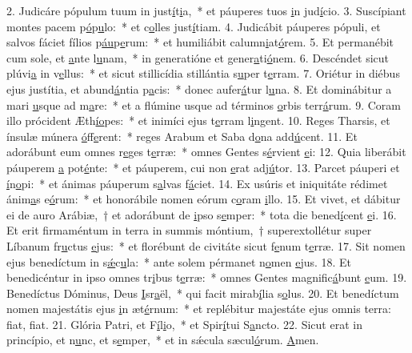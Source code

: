 2. Judicáre pópulum tuum in just\uline{í}t\uline{i}a,~* et páuperes tuos \uline{i}n jud\uline{í}cio.
3. Suscípiant montes pacem p\uline{ó}p\uline{u}lo:~* et c\uline{o}lles just\uline{í}tiam.
4. Judicábit páuperes pópuli, et salvos fáciet fílios p\uline{áu}p\uline{e}rum:~* et humiliábit calumn\uline{i}at\uline{ó}rem.
5. Et permanébit cum sole, et \uline{a}nte l\uline{u}nam,~* in generatióne et gener\uline{a}ti\uline{ó}nem.
6. Descéndet sicut plúvi\uline{a} in v\uline{e}llus:~* et sicut stillicídia stillántia s\uline{u}per t\uline{e}rram.
7. Oriétur in diébus ejus justítia, et abund\uline{á}ntia p\uline{a}cis:~* donec aufer\uline{á}tur l\uline{u}na.
8. Et dominábitur a mari \uline{u}sque ad m\uline{a}re:~* et a flúmine usque ad términos \uline{o}rbis terr\uline{á}rum.
9. Coram illo prócident Æth\uline{í}\uline{o}pes:~* et inimíci ejus t\uline{e}rram l\uline{i}ngent.
10. Reges Tharsis, et ínsulæ múnera \uline{ó}ff\uline{e}rent:~* reges Arabum et Saba d\uline{o}na add\uline{ú}cent.
11. Et adorábunt eum omnes r\uline{e}ges t\uline{e}rræ:~* omnes Gentes s\uline{é}rvient \uline{e}i:
12. Quia liberábit páuperem \uline{a} pot\uline{é}nte:~* et páuperem, cui non \uline{e}rat adj\uline{ú}tor.
13. Parcet páuperi et \uline{í}n\uline{o}pi:~* et ánimas páuperum s\uline{a}lvas f\uline{á}ciet.
14. Ex usúris et iniquitáte rédimet ánim\uline{a}s e\uline{ó}rum:~* et honorábile nomen eórum c\uline{o}ram \uline{i}llo.
15. Et vivet, et dábitur ei de auro Arábiæ,~† et adorábunt de \uline{i}pso s\uline{e}mper:~* tota die bened\uline{í}cent \uline{e}i.
16. Et erit firmaméntum in terra in summis móntium,~† superextollétur super Líbanum fr\uline{u}ctus \uline{e}jus:~* et florébunt de civitáte sicut f\uline{e}num t\uline{e}rræ.
17. Sit nomen ejus benedíctum in s\uline{ǽ}c\uline{u}la:~* ante solem pérmanet n\uline{o}men \uline{e}jus.
18. Et benedicéntur in ipso omnes tr\uline{i}bus t\uline{e}rræ:~* omnes Gentes magnific\uline{á}bunt \uline{e}um.
19. Benedíctus Dóminus, Deus \uline{I}sr\uline{a}ël,~* qui facit mirab\uline{í}lia s\uline{o}lus.
20. Et benedíctum nomen majestátis ejus \uline{i}n æt\uline{é}rnum:~* et replébitur majestáte ejus omnis terra: f\uline{i}at, f\uline{i}at.
21. Glória Patri, et F\uline{í}l\uline{i}o,~* et Spir\uline{í}tui S\uline{a}ncto.
22. Sicut erat in princípio, et n\uline{u}nc, et s\uline{e}mper,~* et in sǽcula sæcul\uline{ó}rum. \uline{A}men.
